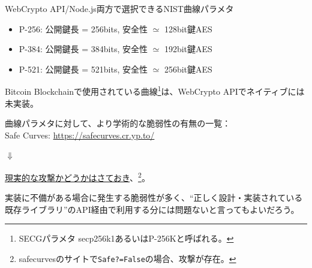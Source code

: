 \documentclass[12pt,dvipdfmx]{beamer}
\newcommand{\backupbegin}{
   \newcounter{framenumberappendix}
   \setcounter{framenumberappendix}{\value{framenumber}}
}
\newcommand{\backupend}{
   \addtocounter{framenumberappendix}{-\value{framenumber}}
   \addtocounter{framenumber}{\value{framenumberappendix}} 
}
\begin{document}
\begin{frame}
\begin{block}{\small WebCrypto API/Node.js両方で選択できるNIST曲線パラメタ}
\begin{itemize}
 \item P-256: 公開鍵長 = 256bits, 安全性 $\simeq$ 128bit鍵AES
 \item P-384: 公開鍵長 = 384bits, 安全性 $\simeq$ 192bit鍵AES
 \item P-521: 公開鍵長 = 521bits, 安全性 $\simeq$ 256bit鍵AES
\end{itemize}
\end{block}
Bitcoin Blockchainで使用されている曲線\footnote[frame]{\scriptsize SECGパラメタ secp256k1あるいはP-256Kと呼ばれる。}は、WebCrypto APIでネイティブには未実装。
\end{frame}

\begin{frame}

曲線パラメタに対して、より学術的な脆弱性の有無の一覧：\\
Safe Curves: \url{https://safecurves.cr.yp.to/}

\begin{center}
 $\Downarrow$
\end{center}

\underline{現実的な攻撃かどうかはさておき}、\footnote[frame]{\scriptsize safecurvesのサイトで\texttt{Safe?=False}の場合、攻撃が存在。}。

実装に不備がある場合に発生する脆弱性が多く、\alert{``正しく設計・実装されている既存ライブラリ''のAPI経由で利用する分には問題ない}と言ってもよいだろう。
\end{frame}







 

\end{document}
